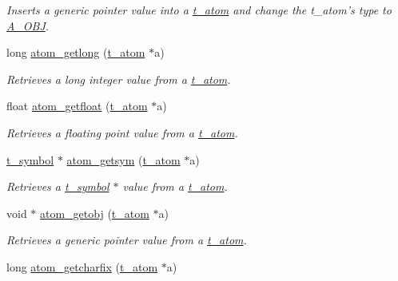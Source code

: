 \begin{DoxyCompactItemize}
\begin{DoxyCompactList}\small\item\em Inserts a generic pointer value into a \hyperlink{structt__atom}{t\_\-atom} and change the t\_\-atom's type to \hyperlink{group__atom_gga8aa6700e9f00b132eb376db6e39ade47a82cc76e0d53c8fc28df167c35d5bbd1a}{A\_\-OBJ}. \item\end{DoxyCompactList}\item 
long \hyperlink{group__atom_ga62c0a631f50db54ec654a9e40b992fe2}{atom\_\-getlong} (\hyperlink{structt__atom}{t\_\-atom} $\ast$a)
\begin{DoxyCompactList}\small\item\em Retrieves a long integer value from a \hyperlink{structt__atom}{t\_\-atom}. \item\end{DoxyCompactList}\item 
float \hyperlink{group__atom_ga28f52239a67244db2e821320702712ca}{atom\_\-getfloat} (\hyperlink{structt__atom}{t\_\-atom} $\ast$a)
\begin{DoxyCompactList}\small\item\em Retrieves a floating point value from a \hyperlink{structt__atom}{t\_\-atom}. \item\end{DoxyCompactList}\item 
\hyperlink{structt__symbol}{t\_\-symbol} $\ast$ \hyperlink{group__atom_gab43922b60c9c2aaf3a4ecabaa432ef61}{atom\_\-getsym} (\hyperlink{structt__atom}{t\_\-atom} $\ast$a)
\begin{DoxyCompactList}\small\item\em Retrieves a \hyperlink{structt__symbol}{t\_\-symbol} $\ast$ value from a \hyperlink{structt__atom}{t\_\-atom}. \item\end{DoxyCompactList}\item 
void $\ast$ \hyperlink{group__atom_ga3fa97bb8b72a394a2918cc55951f8b39}{atom\_\-getobj} (\hyperlink{structt__atom}{t\_\-atom} $\ast$a)
\begin{DoxyCompactList}\small\item\em Retrieves a generic pointer value from a \hyperlink{structt__atom}{t\_\-atom}. \item\end{DoxyCompactList}\item 
long \hyperlink{group__atom_gae9bef849142b12c94f842faa03b3238c}{atom\_\-getcharfix} (\hyperlink{structt__atom}{t\_\-atom} $\ast$a)

\end{DoxyCompactItemize}
